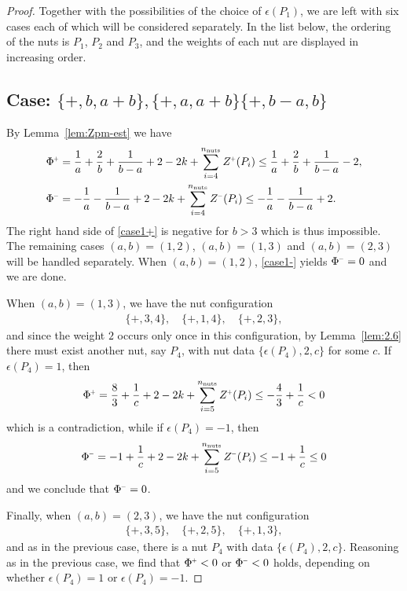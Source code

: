 \documentclass[a4paper,10pt,reqno]{amsart}
\newcommand{\nut}{P}
\theoremstyle{plain}
\newcommand{\nnuts}{n_{\text{\rm nuts}}}
\renewcommand{\P}[1]{{{#1}^{\hspace{-.5pt}\scaleto{+}{4pt}}}}
\newcommand{\M}[1]{{{#1}^{\hspace{-.5pt}\scaleto{-}{4pt}}}}
\numberwithin{equation}{section}
\begin{document}
\begin{proof}
Together with the possibilities of the choice of $\epsilon(\nut_1)$, we are left with six cases each of which will be considered separately. In the list below, the ordering of the nuts is $P_1$, $P_2$ and $P_3$, and the weights of each nut are displayed in increasing order.

\subsection*{Case: $\{+,b,a+b\},\{+,a,a+b\} \{+,b-a ,b\}$}
By Lemma~\ref{lem:Zpm-est} we have
\begin{align} 
\P{\Phi}
&=   
\frac{1}{a}+\frac{2}{b}+\frac{1}{b-a} +2-2k +\sum_{i=4}^{\nnuts}\P{Z}(\nut_i)
\leq 
\frac{1}{a}+\frac{2}{b}+\frac{1}{b-a}-2, \label{case1+}\\
\M{\Phi}
&= 
-\frac{1}{a} -\frac{1}{b-a} +2-2k +\sum_{i=4}^{\nnuts}\M{Z}(\nut_i)
\leq 
-\frac{1}{a} -\frac{1}{b-a} + 2. \label{case1-} 
\end{align}
The right hand side of \eqref{case1+} is negative for $b>3$ which is thus impossible. The remaining cases $(a,b) =(1,2)$, $(a,b)=(1,3)$ and $(a,b)=(2,3)$ will be handled separately. When $(a,b) = (1,2)$, \eqref{case1-} yields $\M{\Phi} = 0$ and we are done.
 
When $(a,b)=(1,3)$, we have the nut configuration 
\begin{align} 
\{+,3,4\}, \quad \{+,1,4\}, \quad \{+,2,3\}, 
\end{align} 
and since the weight $2$ occurs only once in this configuration, by Lemma~\ref{lem:2.6} there must exist another nut, say $\nut_4$, with nut data $\{\epsilon(\nut_4),2,c\}$ for some $c$. If $\epsilon(\nut_4)=1$, then
\begin{align}
\P{\Phi}
=\frac{8}{3}+\frac{1}{c} +2-2k +\sum_{i=5}^{\nnuts}\P{Z}(\nut_i)
\leq -\frac{4}{3}+\frac{1}{c}
<0
\end{align} 
which is a contradiction, while if $\epsilon(\nut_4)=-1$, then 
\begin{align}
\M{\Phi}
=-1+\frac{1}{c} +2-2k +\sum_{i=5}^{\nnuts}\M{Z}(\nut_i)
\leq-1+\frac{1}{c}
\leq 0
\end{align}
and we conclude that $\M{\Phi} = 0$.

Finally, when $(a,b)=(2,3)$, we have the nut configuration 
\begin{align} 
\{+,3,5\},\quad \{+,2,5\}, \quad \{+,1,3\}, 
\end{align} 
and as in the previous case, there is a nut $\nut_4$ with data $\{\epsilon(\nut_4),2,c\}$. Reasoning as in the previous case, we find that $\P{\Phi} < 0$ or $\M{\Phi} < 0$ holds, depending on whether $\epsilon(\nut_4)=1$ or $\epsilon(\nut_4)=-1$.


\end{proof}
\end{document}
